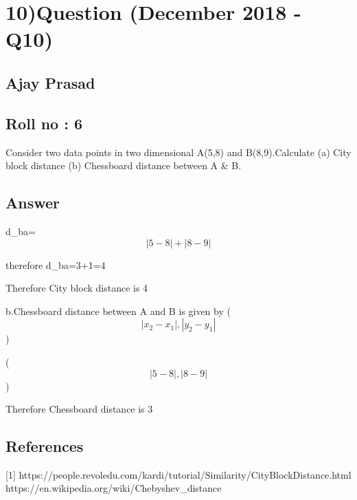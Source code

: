 \section*{10)Question (December 2018 - Q10)}
    \subsection*{\large Ajay Prasad}
    \subsection*{Roll no : 6}
 {Consider two data points in two dimensional A(5,8) and B(8,9).Calculate 
(a) City block distance (b) Chessboard distance between A \& B.}
\subsection*{Answer}

\hspace{0.55cm}{a.City block distance is given by,\[ \sum_{i=1}^{n} \left|x_{ik}-x{jk}\right| \] }
\newline

 d_{ba}= \[ \left|5-8\right|  +  \left|8-9\right| \] 


{ therefore  d_{ba}=3+1=4} 

{Therefore City block distance is 4}
\vspace{1cm}

{b.Chessboard distance between A and B is given by}  \max (\[\left|x_2-x_1 \right| , \left|y_2-y_1 \right| \])

{\max(\[\left|5-8 \right| ,\left|8-9\right|\]) }


{Therefore Chessboard distance is 3}
\subsection*{References}
   [1] https://people.revoledu.com/kardi/tutorial/Similarity/CityBlockDistance.html \newline
   [2] https://en.wikipedia.org/wiki/Chebyshev\_distance